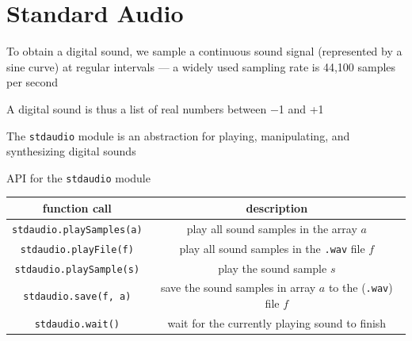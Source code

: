 \documentclass[8pt,a4paper,compress]{beamer}
\begin{document}
\section{Standard Audio}
\begin{frame}[fragile]
\pause

To obtain a digital sound, we sample a continuous sound signal (represented by a sine curve) at regular intervals --- a widely used sampling rate is 44,100 samples per second

\pause
\bigskip

A digital sound is thus a list of real numbers between −1 and +1

\pause
\bigskip

The \lstinline{stdaudio} module is an abstraction for playing, manipulating, and synthesizing digital sounds

\pause
\bigskip

API for the \lstinline{stdaudio} module
\begin{center}
\begin{tabular}{cc}
function call & description \\ \hline
\lstinline$stdaudio.playSamples(a)$ & play all sound samples in the array $a$ \\
\lstinline$stdaudio.playFile(f)$ & play all sound samples in the \lstinline$.wav$ file $f$ \\
\lstinline$stdaudio.playSample(s)$ & play the sound sample $s$ \\
\lstinline$stdaudio.save(f, a)$ & save the sound samples in array $a$ to the (\lstinline$.wav$) file $f$ \\
\lstinline$stdaudio.wait()$ & wait for the currently playing sound to finish
\end{tabular} 
\end{center}
\end{frame}
\end{document}
